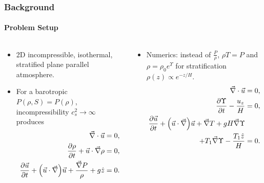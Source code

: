 \documentclass[dvipsnames, 10pt]{beamer}
\newcommand*{\pd}[2]{\frac{\partial#1}{\partial#2}}
\DeclarePairedDelimiter\p{\lparen}{\rparen}
\begin{document}
\begin{frame}
    \frametitle{Background}
    \framesubtitle{Problem Setup}
    \begin{columns}
        \begin{column}{0.5\textwidth}
            {\small
            \begin{itemize}
                \item 2D incompressible, isothermal, stratified  plane parallel
                    atmosphere.

                \item For a barotropic $P(\rho, S) = P(\rho)$, incompressibility
                    $c_s^2 \to \infty$ produces
                    \begin{subequations}\label{se:fc_orig}
                        \begin{align}
                            \vec{\nabla} \cdot \vec{u} &= 0,\\
                            \pd{\rho}{t} + \vec{u} \cdot \vec{\nabla}\rho &= 0,\\
                            \pd{\vec{u}}{t} + \p*{\vec{u} \cdot \vec{\nabla}}\vec{u}
                                + \frac{\vec{\nabla}P}{\rho}
                                + g\hat{z} &= 0.
                        \end{align}
                    \end{subequations}
            \end{itemize}
            }
        \end{column}
        \begin{column}{0.5\textwidth}
            {\small
            \begin{itemize}
                \item Numerics: instead of $\frac{P}{\rho}$, $\rho T = P$ and
                    $\rho = \rho_0 e^\Upsilon$ for stratification $\rho(z)
                    \propto e^{-z/H}$.
                \begin{subequations}
                    \begin{align}
                        \vec{\nabla} \cdot \vec{u} &= 0,\\
                        \pd{\Upsilon}{t} - \frac{u_z}{H} &= 0,\\
                        \pd{\vec{u}}{t} + \p*{\vec{u} \cdot \vec{\nabla}}\vec{u}
                            + \vec{\nabla}T + gH \vec{\nabla}\Upsilon &\nonumber\\
                            + T_1\vec{\nabla}\Upsilon - \frac{T_1\hat{z}}{H} &= 0.
                    \end{align}
                \end{subequations}
            \end{itemize}
            }
        \end{column}
    \end{columns}
\end{frame}
\end{document}
